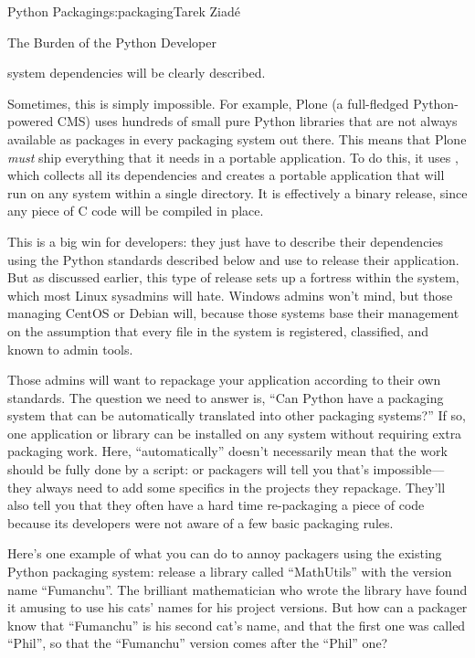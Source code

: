 \begin{aosachapter}{Python Packaging}{s:packaging}{Tarek Ziad\'{e}}
\begin{aosasect1}{The Burden of the Python Developer}
\begin{aosaitemize}
  \item system dependencies will be clearly described.

\end{aosaitemize}

Sometimes, this is simply impossible.  For example, Plone (a
full-fledged Python-powered CMS) uses hundreds of small pure Python
libraries that are not always available as packages in every packaging
system out there.  This means that Plone \emph{must} ship everything
that it needs in a portable application. To do this, it uses
, which collects all its dependencies and creates a
portable application that will run on any system within a single
directory. It is effectively a binary release, since any piece of C
code will be compiled in place.

This is a big win for developers: they just have to describe their
dependencies using the Python standards described below
and use  to
release their application.  But as discussed earlier, this type of
release sets up a fortress within the system, which most Linux sysadmins
will hate.  Windows admins won't mind, but those managing
CentOS or Debian will, because those systems base their management on
the assumption that every file in the system is registered,
classified, and known to admin tools.

Those admins will want to repackage your application according to
their own standards.  The question we need to answer is, ``Can Python
have a packaging system that can be automatically translated into
other packaging systems?''  If so, one application or library can be
installed on any system without requiring extra packaging work.  Here,
``automatically'' doesn't necessarily mean that the work should be
fully done by a script:  or  packagers will tell
you that's impossible---they always need to add some specifics in the
projects they repackage.  They'll also tell you that they
often have a hard time re-packaging a piece of code because its
developers were not aware of a few basic packaging rules.

Here's one example of what you can do to annoy packagers using the
existing Python packaging system: release a library called
``MathUtils'' with the version name ``Fumanchu''.  The brilliant
mathematician who wrote the library have found it amusing to use
his cats' names for his project versions.  But how can a packager know
that ``Fumanchu'' is his second cat's name, and that the first one was
called ``Phil'', so that the ``Fumanchu'' version comes after the
``Phil'' one?


\end{aosasect1}
\end{aosachapter}
